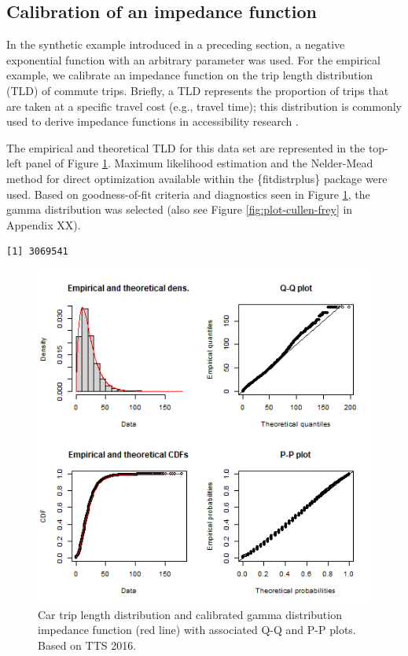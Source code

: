 \documentclass[]{elsarticle} %
\begin{document}
\hypertarget{calibration-of-an-impedance-function}{%
\subsection{Calibration of an impedance
function}\label{calibration-of-an-impedance-function}}

In the synthetic example introduced in a preceding section, a negative
exponential function with an arbitrary parameter was used. For the
empirical example, we calibrate an impedance function on the trip length
distribution (TLD) of commute trips. Briefly, a TLD represents the
proportion of trips that are taken at a specific travel cost (e.g.,
travel time); this distribution is commonly used to derive impedance
functions in accessibility research
\citep{horbachov_theoretical_2018, batista_estimation_2019}.

The empirical and theoretical TLD for this data set are represented in
the top-left panel of Figure \ref{fig:TLD-Gamma-plot}. Maximum
likelihood estimation and the Nelder-Mead method for direct optimization
available within the \{fitdistrplus\} package \citep{fitdistrplus_2015}
were used. Based on goodness-of-fit criteria and diagnostics seen in
Figure \ref{fig:TLD-Gamma-plot}, the gamma distribution was selected
(also see Figure \ref{fig:plot-cullen-frey} in Appendix XX).

\begin{verbatim}
[1] 3069541
\end{verbatim}

\begin{figure}

{\centering \includegraphics[width=0.8\linewidth]{images/impedance_function} 

}

\caption{\label{fig:TLD-Gamma-plot}Car trip length distribution and calibrated gamma distribution impedance function (red line) with associated Q-Q and P-P plots. Based on TTS 2016.}\label{fig:TLD-Gamma-plot}
\end{figure}
\end{document}
